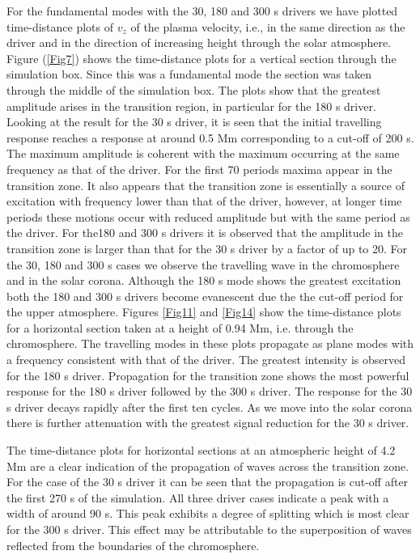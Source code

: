 \documentclass[preprint,authoryear,12pt]{elsarticle}
\begin{document}
For the fundamental modes with the 30, 180 and 300 s drivers we have plotted time-distance plots of $v_z$ of the plasma velocity, i.e., in the same direction as the driver and in the direction of increasing height through the solar atmosphere.  Figure (\ref{Fig7})
 shows the time-distance plots for a vertical section through the simulation box. Since this was a fundamental mode the section was taken through the middle of the simulation box. The plots show that the greatest amplitude arises in the transition region, in particular for the 180 s driver. Looking at the result for the 30 s driver, it is seen that the initial travelling response reaches a response at around 0.5 Mm corresponding to a cut-off of 200 s. The maximum amplitude is coherent with the maximum occurring at the same frequency as that of the driver. For the first 70 periods maxima appear in the transition zone. It also appears that the transition zone is essentially a source of excitation with frequency lower than that of the driver, however, at longer time periods these motions occur with reduced amplitude but with the same period as the driver. For the180 and 300 s drivers it is observed that the amplitude in the transition zone is larger than that for the 30 s driver by a factor of up to 20. For the 30, 180 and 300 s cases we observe the travelling wave in the chromosphere and in the solar corona. Although the 180 s mode shows the greatest excitation both the 180 and 300 s drivers become evanescent due the the cut-off period for the upper atmosphere. Figures \ref{Fig11} and \ref{Fig14} show the time-distance plots for a horizontal section taken at a height of 0.94 Mm, i.e. through the chromosphere. The travelling modes in these plots propagate as plane modes with a frequency consistent with that of the driver. The greatest intensity is observed for the 180 s driver. Propagation for the transition zone shows the most powerful response for the 180 s driver followed by the 300 s driver. The response for the 30 s driver decays rapidly after the first ten cycles. As we move into the solar corona there is further attenuation with the greatest signal reduction for the 30 s driver.

The time-distance plots  for horizontal sections at an atmospheric height of 4.2 Mm are a clear indication of the propagation of waves across the transition zone. For the case of the 30 s driver it can be seen that  the propagation is cut-off after the first 270 s of the simulation. All three driver cases indicate a peak with a width of around 90 s. This peak exhibits a degree of splitting which is most clear for the 300 s driver.  This effect may be attributable to the superposition of waves reflected from the boundaries of the chromosphere.
\end{document}
